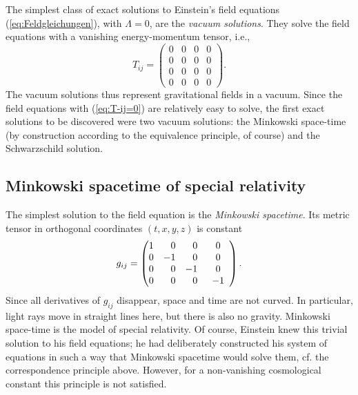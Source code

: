 The simplest class of exact solutions to Einstein's
field equations (\ref{eq:Feldgleichungen}), with $\Lambda = 0$, are the
\emph{vacuum solutions}.
They solve the field equations with a vanishing
energy-momentum tensor, i.e.,
\begin{equation}
	T_{ij}
	= \left(\begin{array}{cccc}
		0   &   0   &   0   &  0 \\
		0   &   0   &   0   &  0 \\
		0   &   0   &   0   &  0 \\
		0   &   0   &   0   &  0
	\end{array}\right)
	.
	\label{eq:T-ij=0}
\end{equation}
The vacuum solutions thus represent gravitational fields in
a vacuum.
Since the field equations with (\ref{eq:T-ij=0}) are relatively
easy to solve, the first exact solutions to be discovered were two vacuum solutions:
the Minkowski space-time (by construction according to the equivalence principle, of course) and the Schwarzschild solution.


\subsection{Minkowski spacetime of special relativity}
The simplest solution to the field equation is the
\emph{Minkowski spacetime}.
Its metric tensor in orthogonal coordinates $(t, x, y, z)$ is constant
\begin{equation}
	g_{ij}
	= \left(\begin{array}{@{}rrr@{\hspace*{3.5ex}}c}
		1   &   0   &    0   &  0 \\
		0   &  -1   &    0   &  0 \\
		0   &   0   &   -1   &  0 \\
		0   &   0   &    0   & -1
	\end{array}\right)
	.
	\label{eq:g-Minkoski}
\end{equation}
Since all derivatives of $g_{ij}$ disappear, space
and time are not curved.
In particular, light rays move in straight lines here,
but there is also no gravity.
Min\-kow\-ski space-time is the model of special
relativity.
Of course, Einstein knew this trivial solution
to his field equations; he had deliberately constructed his system of equations
in such a way that Minkowski spacetime would solve them,
cf. the correspondence principle above. However, for a non-vanishing cosmological constant this principle is not satisfied. \cite[151]{Straumann-1988}


